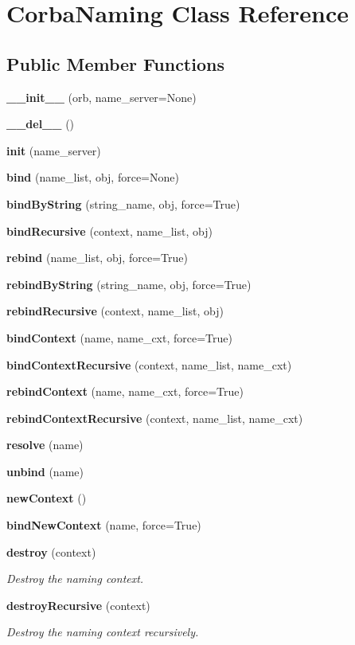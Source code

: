 \section{Corba\-Naming Class Reference}
\label{classCorbaNaming}
\subsection*{Public Member Functions}
\begin{CompactItemize}
\item 
{\bf \_\-\_\-init\_\-\_\-} (orb, name\_\-server=None)
\item 
{\bf \_\-\_\-del\_\-\_\-} ()
\item 
{\bf init} (name\_\-server)
\item 
{\bf bind} (name\_\-list, obj, force=None)
\item 
{\bf bind\-By\-String} (string\_\-name, obj, force=True)
\item 
{\bf bind\-Recursive} (context, name\_\-list, obj)
\item 
{\bf rebind} (name\_\-list, obj, force=True)
\item 
{\bf rebind\-By\-String} (string\_\-name, obj, force=True)
\item 
{\bf rebind\-Recursive} (context, name\_\-list, obj)
\item 
{\bf bind\-Context} (name, name\_\-cxt, force=True)
\item 
{\bf bind\-Context\-Recursive} (context, name\_\-list, name\_\-cxt)
\item 
{\bf rebind\-Context} (name, name\_\-cxt, force=True)
\item 
{\bf rebind\-Context\-Recursive} (context, name\_\-list, name\_\-cxt)
\item 
{\bf resolve} (name)
\item 
{\bf unbind} (name)
\item 
{\bf new\-Context} ()
\item 
{\bf bind\-New\-Context} (name, force=True)
\item 
{\bf destroy} (context)
\begin{CompactList}\small\item\em Destroy the naming context. \item\end{CompactList}\item 
{\bf destroy\-Recursive} (context)
\begin{CompactList}\small\item\em Destroy the naming context recursively. \item\end{CompactList}\item 

\end{CompactItemize}
